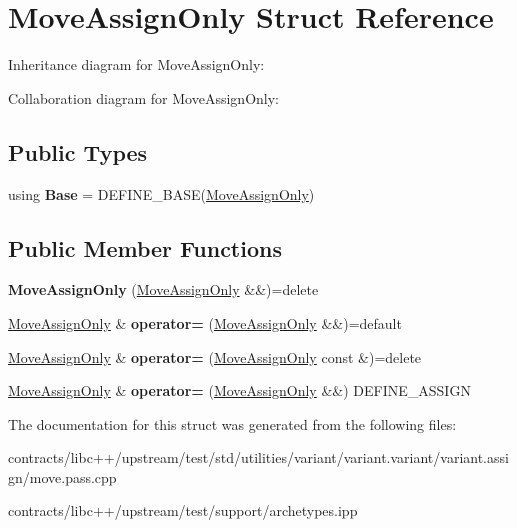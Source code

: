 \hypertarget{struct_move_assign_only}{}\section{Move\+Assign\+Only Struct Reference}
\label{struct_move_assign_only}


Inheritance diagram for Move\+Assign\+Only\+:


Collaboration diagram for Move\+Assign\+Only\+:
\subsection*{Public Types}
\begin{DoxyCompactItemize}
\item 
\mbox{\label{struct_move_assign_only_a425387378c009a67b77f3b5ac0c49a62}} 
using {\bfseries Base} = D\+E\+F\+I\+N\+E\+\_\+\+B\+A\+SE(\mbox{\hyperlink{struct_move_assign_only}{Move\+Assign\+Only}})
\end{DoxyCompactItemize}
\subsection*{Public Member Functions}
\begin{DoxyCompactItemize}
\item 
\mbox{\label{struct_move_assign_only_a19044c62609440df5bba137de7154478}} 
{\bfseries Move\+Assign\+Only} (\mbox{\hyperlink{struct_move_assign_only}{Move\+Assign\+Only}} \&\&)=delete
\item 
\mbox{\label{struct_move_assign_only_a54ea5314352d97c55096aaa4e2fcc367}} 
\mbox{\hyperlink{struct_move_assign_only}{Move\+Assign\+Only}} \& {\bfseries operator=} (\mbox{\hyperlink{struct_move_assign_only}{Move\+Assign\+Only}} \&\&)=default
\item 
\mbox{\label{struct_move_assign_only_ad6517ee85590153f91800f96cb44c456}} 
\mbox{\hyperlink{struct_move_assign_only}{Move\+Assign\+Only}} \& {\bfseries operator=} (\mbox{\hyperlink{struct_move_assign_only}{Move\+Assign\+Only}} const \&)=delete
\item 
\mbox{\label{struct_move_assign_only_a59363525b46fa486863b562eca86bf96}} 
\mbox{\hyperlink{struct_move_assign_only}{Move\+Assign\+Only}} \& {\bfseries operator=} (\mbox{\hyperlink{struct_move_assign_only}{Move\+Assign\+Only}} \&\&) D\+E\+F\+I\+N\+E\+\_\+\+A\+S\+S\+I\+GN
\end{DoxyCompactItemize}


The documentation for this struct was generated from the following files\+:\begin{DoxyCompactItemize}
\item 
contracts/libc++/upstream/test/std/utilities/variant/variant.\+variant/variant.\+assign/move.\+pass.\+cpp\item 
contracts/libc++/upstream/test/support/archetypes.\+ipp\end{DoxyCompactItemize}

